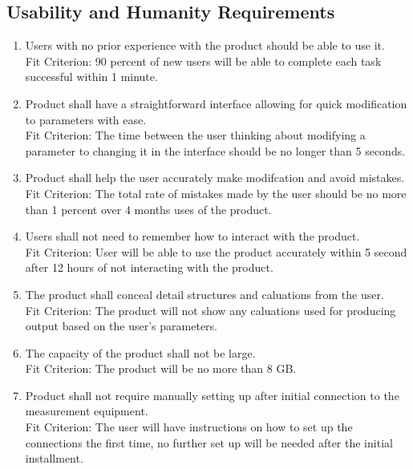 \documentclass[12pt, titlepage]{article}
\begin{document}
\subsection{Usability and Humanity Requirements}
\begin{adjustwidth}{2.2em}{0pt}
\begin{enumerate}[{NFR-U}1.]
  \item Users with no prior experience with the product should be able to use it.\\
  Fit Criterion: 90 percent of new users will be able to complete each task successful within 1 minute. 
  \item Product shall have a straightforward interface allowing for quick modification to parameters with ease.\\
  Fit Criterion: The time between the user thinking about modifying a parameter to changing it in the interface should be no longer than 5 seconds.
  \item Product shall help the user accurately make modifcation and avoid mistakes.\\
  Fit Criterion: The total rate of mistakes made by the user should be no more than 1 percent over 4 months uses of the product. 
  \item Users shall not need to remember how to interact with the product.\\
  Fit Criterion: User will be able to use the product accurately within 5 second after 12 hours of not interacting with the product.
  \item The product shall conceal detail structures and caluations from the user.\\
  Fit Criterion: The product will not show any caluations used for producing output based on the user's parameters.
  \item The capacity of the product shall not be large.\\
  Fit Criterion: The product will be no more than 8 GB.
  \item Product shall not require manually setting up after initial connection to the measurement equipment.\\
  Fit Criterion: The user will have instructions on how to set up the connections the first time, no further set up will be needed after the initial installment.
\end{enumerate}
\end{adjustwidth}
\end{document}
